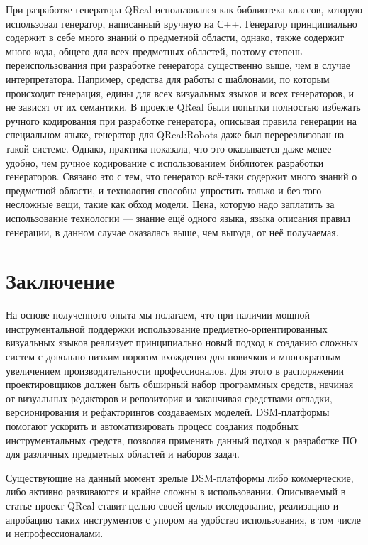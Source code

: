 \documentclass[a4]{article}
\begin{document}
При разработке генератора QReal использовался как библиотека классов, которую использовал генератор, написанный вручную на С++. Генератор принципиально содержит в себе много знаний о предметной области, однако, также содержит много кода, общего для всех предметных областей, поэтому степень переиспользования при разработке генератора существенно выше, чем в случае интерпретатора. Например, средства для работы с шаблонами, по которым происходит генерация, едины для всех визуальных языков и всех генераторов, и не зависят от их семантики. В проекте QReal были попытки полностью избежать ручного кодирования при разработке генератора, описывая правила генерации на специальном языке, генератор для QReal:Robots даже был перереализован на такой системе. Однако, практика показала, что это оказывается даже менее удобно, чем ручное кодирование с использованием библиотек разработки генераторов. Связано это с тем, что генератор всё-таки содержит много знаний о предметной области, и технология способна упростить только и без того несложные вещи, такие как обход модели. Цена, которую надо заплатить за использование технологии --- знание ещё одного языка, языка описания правил генерации, в данном случае оказалась выше, чем выгода, от неё получаемая.

\section*{Заключение}

На основе полученного опыта мы полагаем, что при наличии мощной инструментальной поддержки использование предметно-ориентированных визуальных языков реализует принципиально новый подход к созданию сложных систем с довольно низким порогом вхождения для новичков и многократным увеличением производительности профессионалов. Для этого в распоряжении проектировщиков должен быть обширный набор программных средств, начиная от визуальных редакторов и репозитория и заканчивая средствами отладки, версионирования и рефакторингов создаваемых моделей. DSM-платформы помогают ускорить и автоматизировать процесс создания подобных инструментальных средств, позволяя применять данный подход к разработке ПО для различных предметных областей и наборов задач. 

Существующие на данный момент зрелые DSM-платформы либо коммерческие, либо активно развиваются и крайне сложны в использовании. Описываемый в статье проект QReal ставит целью своей целью исследование, реализацию и апробацию таких инструментов с упором на удобство использования, в том числе и непрофессионалами. 
\end{document}
